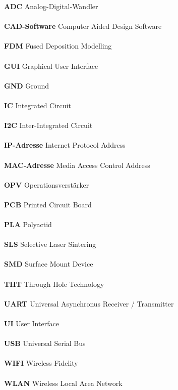 \documentclass[titlepage,12pt,twoside]{article}
\begin{document}
{\large \textbf{ADC}} Analog-Digital-Wandler \\
\\
{\large \textbf{CAD-Software}} Computer Aided Design Software \\
\\
{\large \textbf{FDM}} Fused Deposition Modelling \\
\\
{\large \textbf{GUI}} Graphical User Interface \\
\\
{\large \textbf{GND}} Ground \\
\\
{\large \textbf{IC}} Integrated Circuit \\
\\
{\large \textbf{I2C}} Inter-Integrated Circuit \\
\\
{\large \textbf{IP-Adresse}} Internet Protocol Address \\
\\
{\large \textbf{MAC-Adresse}} Media Access Control Address \\
\\
{\large \textbf{OPV}} Operationsverstärker \\
\\
{\large \textbf{PCB}} Printed Circuit Board \\
\\
{\large \textbf{PLA}} Polyactid \\
\\
{\large \textbf{SLS}} Selective Laser Sintering \\
\\
{\large \textbf{SMD}} Surface Mount Device \\
\\
{\large \textbf{THT}} Through Hole Technology \\
\\
{\large \textbf{UART}} Universal Asynchronus Receiver / Transmitter \\
\\
{\large \textbf{UI}} User Interface \\
\\
{\large \textbf{USB}} Universal Serial Bus \\
\\
{\large \textbf{WIFI}} Wireless Fidelity \\
\\
{\large \textbf{WLAN}} Wireless Local Area Network \\
\\
\end{document}
